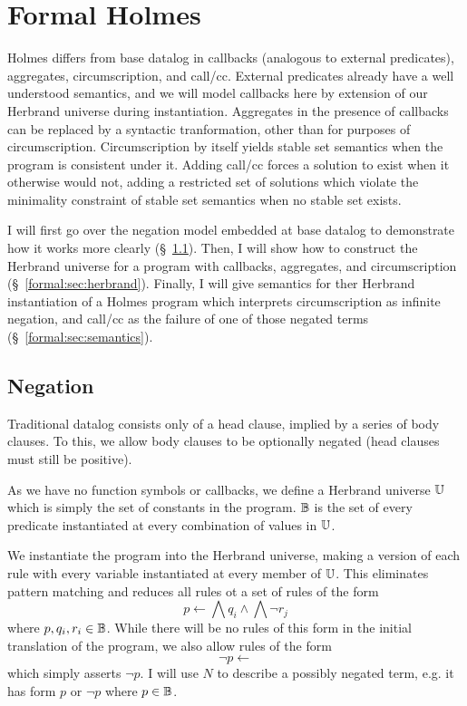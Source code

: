 
\chapter{Formal Holmes}
\label{chap:formal}
Holmes differs from base datalog in callbacks (analogous to external predicates), aggregates, circumscription, and call/cc.
External predicates already have a well understood semantics, and we will model callbacks here by extension of our Herbrand universe during instantiation.
Aggregates in the presence of callbacks can be replaced by a syntactic tranformation, other than for purposes of circumscription.
Circumscription by itself yields stable set semantics when the program is consistent under it.
Adding call/cc forces a solution to exist when it otherwise would not, adding a restricted set of solutions which violate the minimality constraint of stable set semantics when no stable set exists.

I will first go over the negation model embedded at base datalog to demonstrate how it works more clearly (\S~\ref{formal:sec:negation}).
Then, I will show how to construct the Herbrand universe for a program with callbacks, aggregates, and circumscription (\S~\ref{formal:sec:herbrand}).
Finally, I will give semantics for ther Herbrand instantiation of a Holmes program which interprets circumscription as infinite negation, and call/cc as the failure of one of those negated terms (\S~\ref{formal:sec:semantics}).
\section{Negation}
\label{formal:sec:negation}
Traditional datalog consists only of a head clause, implied by a series of body clauses.
To this, we allow body clauses to be optionally negated (head clauses must still be positive).

As we have no function symbols or callbacks, we define a Herbrand universe $\mathbb{U}$ which is simply the set of constants in the program.
$\mathbb{B}$ is the set of every predicate instantiated at every combination of values in $\mathbb{U}$.

We instantiate the program into the Herbrand universe, making a version of each rule with every variable instantiated at every member of $\mathbb{U}$.
This eliminates pattern matching and reduces all rules ot a set of rules of the form
\[
	p \leftarrow \bigwedge q_i \wedge \bigwedge \neg r_j
\]
where $p, q_i, r_i \in \mathbb{B}$.
While there will be no rules of this form in the initial translation of the program, we also allow rules of the form
\[
	\neg p \leftarrow
\]
which simply asserts $\neg p$.
I will use $N$ to describe a possibly negated term, e.g. it has form $p$ or $\neg p$ where $p \in \mathbb{B}$.

